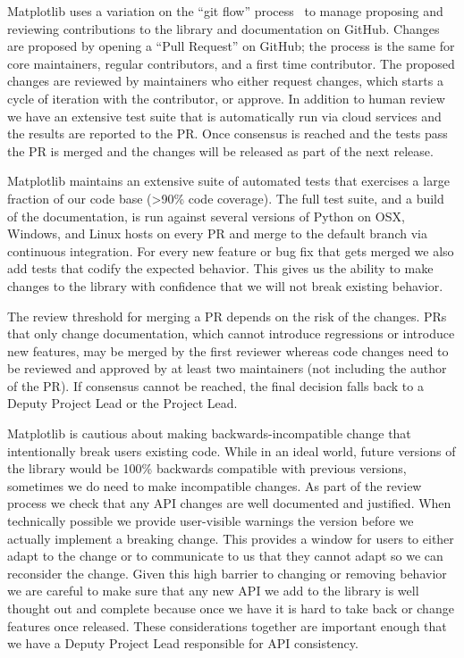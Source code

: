 \documentclass[12pt]{article}
\numberwithin{page}{section}
\begin{document}
Matplotlib uses a variation on the ``git flow'' process~\cite{ghflow}
to manage proposing and reviewing contributions to the library and
documentation on GitHub.  Changes are proposed by opening a ``Pull
Request'' on GitHub; the process is the same for core maintainers,
regular contributors, and a first time contributor.  The proposed
changes are reviewed by maintainers who either request changes, which
starts a cycle of iteration with the contributor, or approve.  In
addition to human review we have an extensive test suite that is
automatically run via cloud services and the results are reported to
the PR.  Once consensus is reached and the tests pass the PR is merged
and the changes will be released as part of the next release.

Matplotlib maintains an extensive suite of automated tests that
exercises a large fraction of our code base (>90\% code coverage).  The full test suite, and
a build of the documentation, is run against several versions of
Python on OSX, Windows, and Linux hosts on every PR and merge to the
default branch via continuous integration.  For every new feature or
bug fix that gets merged we also add tests that codify the expected
behavior.  This gives us the ability to make changes to the library
with confidence that we will not break existing behavior.

The review threshold for merging a PR depends on the risk of the changes.  PRs
that only change documentation, which cannot introduce regressions or introduce
new features, may be merged by the first reviewer whereas code changes need to
be reviewed and approved by at least two maintainers (not including the author
of the PR).  If consensus cannot be reached, the final decision falls back to a
Deputy Project Lead or the Project Lead.

Matplotlib is cautious about making backwards-incompatible change that
intentionally break users existing code.  While in an ideal world, future
versions of the library would be 100\% backwards compatible with previous
versions, sometimes we do need to make incompatible changes.  As part of the
review process we check that any API changes are well documented and justified.
When technically possible we provide user-visible warnings the version before
we actually implement a breaking change.  This provides a window for users to
either adapt to the change or to communicate to us that they cannot adapt so we
can reconsider the change.  Given this high barrier to changing or removing
behavior we are careful to make sure that any new API we add to the library is
well thought out and complete because once we have it is hard to take back or
change features once released.  These considerations together are important
enough that we have a Deputy Project Lead responsible for API consistency.
\end{document}
